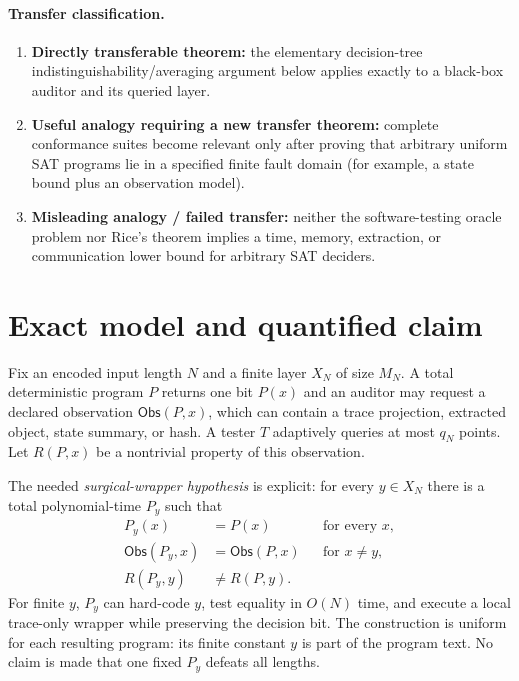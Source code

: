 \documentclass[11pt]{article}
\newcommand{\Obs}{\mathsf{Obs}}
\begin{document}
\paragraph{Transfer classification.}
\begin{enumerate}[leftmargin=*]
\item \textbf{Directly transferable theorem:} the elementary decision-tree indistinguishability/averaging argument below applies exactly to a black-box auditor and its queried layer.
\item \textbf{Useful analogy requiring a new transfer theorem:} complete conformance suites become relevant only after proving that arbitrary uniform SAT programs lie in a specified finite fault domain (for example, a state bound plus an observation model).
\item \textbf{Misleading analogy / failed transfer:} neither the software-testing oracle problem nor Rice's theorem implies a time, memory, extraction, or communication lower bound for arbitrary SAT deciders.
\end{enumerate}

\section{Exact model and quantified claim}

Fix an encoded input length $N$ and a finite layer $X_N$ of size $M_N$.  A total deterministic program $P$ returns one bit $P(x)$ and an auditor may request a declared observation $\Obs(P,x)$, which can contain a trace projection, extracted object, state summary, or hash.  A tester $T$ adaptively queries at most $q_N$ points.  Let $R(P,x)$ be a nontrivial property of this observation.

The needed \emph{surgical-wrapper hypothesis} is explicit: for every $y\in X_N$ there is a total polynomial-time $P_y$ such that
\begin{align}
P_y(x)&=P(x) &&\text{for every }x,\label{eq:semantic}\\
\Obs(P_y,x)&=\Obs(P,x) &&\text{for }x\ne y,\label{eq:outside}\\
R(P_y,y)&\ne R(P,y). &&\label{eq:needle}
\end{align}
For finite $y$, $P_y$ can hard-code $y$, test equality in $O(N)$ time, and execute a local trace-only wrapper while preserving the decision bit.  The construction is uniform for each resulting program: its finite constant $y$ is part of the program text.  No claim is made that one fixed $P_y$ defeats all lengths.
\end{document}
